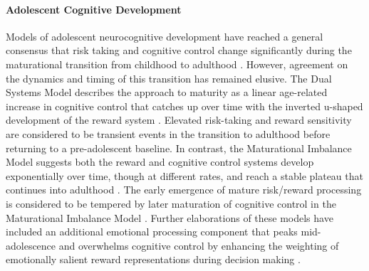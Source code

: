 \documentclass[utf8]{frontiersSCNS} %
\begin{document}
\paragraph*{Adolescent Cognitive Development} Models of adolescent neurocognitive development have reached a general consensus that risk taking and cognitive control change significantly during the maturational transition from childhood to adulthood \citep{Steinberg2010}. However, agreement on the dynamics and timing of this transition has remained elusive. The Dual Systems Model describes the approach to maturity as a linear age-related increase in cognitive control that catches up over time with the inverted u-shaped development of the reward system \citep{Steinberg2005}. Elevated risk-taking and reward sensitivity are considered to be transient events in the transition to adulthood before returning to a pre-adolescent baseline. In contrast, the Maturational Imbalance Model suggests both the reward and cognitive control systems develop exponentially over time, though at different rates, and reach a stable plateau that continues into adulthood \citep{CaseyEtAl2008}. The early emergence of mature risk/reward processing is considered to be tempered by later maturation of cognitive control in the Maturational Imbalance Model \citep{somerville2010developmental}. Further elaborations of these models have included an additional emotional processing component that peaks mid-adolescence and overwhelms cognitive control by enhancing the weighting of emotionally salient reward representations during decision making \citep{casey2019development}.
\vspace{4pt}
\end{document}

